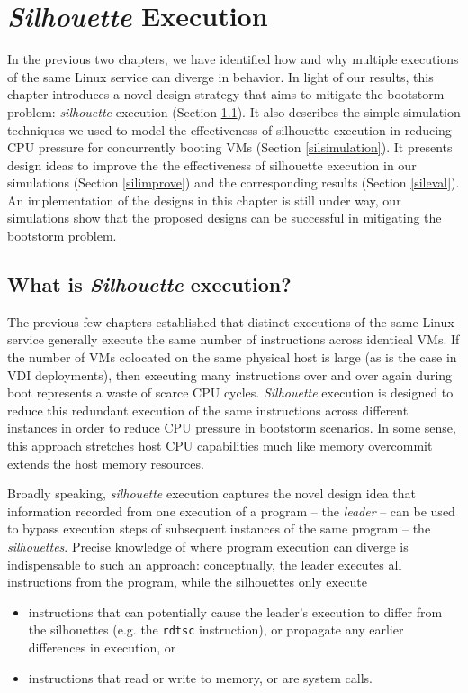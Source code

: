 \chapter{{\em Silhouette} Execution}
In the previous two chapters,
we have identified how and why
multiple executions of the same
Linux service can diverge in behavior.
In light of our results, this chapter introduces a 
novel design strategy that aims to mitigate the bootstorm problem:
{\em silhouette} execution (Section \ref{def:sil}).
It also describes the simple simulation techniques we used 
to model the effectiveness of silhouette
execution in reducing CPU pressure for concurrently booting VMs 
(Section \ref{silsimulation}).
It presents design ideas to improve
the the effectiveness of 
silhouette execution in our simulations (Section \ref{silimprove})
and the corresponding results (Section \ref{sileval}).
An implementation of the designs in this 
chapter is still under way, our simulations 
show that the proposed designs can be successful
in mitigating the bootstorm problem.


\section{What is {\em Silhouette} execution?} \label{def:sil}
The previous few chapters established that
distinct executions of the same Linux service
generally execute the same number of instructions
across identical VMs. If the number of VMs colocated
on the same physical host is large (as is 
the case in VDI deployments),
then executing many instructions over
and over again during boot represents a waste of scarce CPU cycles.
{\em Silhouette} execution is designed to reduce this 
redundant execution of the same instructions across different
instances in order to reduce CPU pressure in bootstorm
scenarios. In some sense,
this approach stretches host CPU capabilities much like
memory overcommit extends
the host memory resources.

Broadly speaking, {\em silhouette} execution captures the
novel design idea that information recorded from one
execution of a program -- the {\em leader} -- can be used to 
bypass execution steps of subsequent instances
of the same program -- the {\em silhouettes}. 
Precise knowledge of where program execution can diverge 
is indispensable to such an approach:
conceptually, the leader executes all instructions from the program, 
while the silhouettes only execute

\begin{itemize}
\item instructions that can potentially cause the leader's
  execution to differ from the silhouettes (e.g. the \texttt{rdtsc}
  instruction), or propagate any earlier differences in execution, or 
\item instructions that read or write to memory, or are system calls.
\end{itemize}


